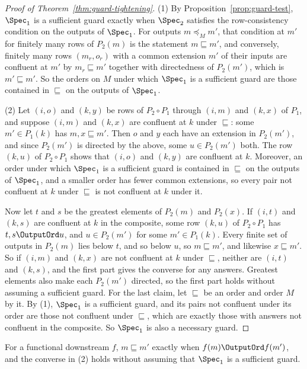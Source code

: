 \begin{proof}[Proof of Theorem~\ref{thm:guard-tightening}]
(1) By Proposition~\ref{prop:guard-test}, $\Spec_1$ is a sufficient guard exactly when
$\Spec_2$ satisfies the row-consistency condition on the outputs of
$\Spec_1$.  For outputs $m\preceq_M m'$, that condition at $m'$ for finitely
many rows of $P_2(m)$ is the statement $m\sqsubseteq m'$, and conversely,
finitely many rows $(m_r,o_r)$ with a common extension $m'$ of their inputs
are confluent at $m'$ by $m_r\sqsubseteq m'$ together with directedness of
$P_2(m')$, which is $m'\sqsubseteq m'$.  So the orders on $M$ under which
$\Spec_1$ is a sufficient guard are those contained in $\sqsubseteq$ on the
outputs of $\Spec_1$.

(2) Let $(i,o)$ and $(k,y)$ be rows of $P_2\circ P_1$ through $(i,m)$ and
$(k,x)$ of $P_1$, and suppose $(i,m)$ and $(k,x)$ are confluent at $k$ under
$\sqsubseteq$: some $m'\in P_1(k)$ has $m,x\sqsubseteq m'$.  Then $o$ and $y$
each have an extension in $P_2(m')$, and since $P_2(m')$ is directed by the above,
some $u\in P_2(m')$ \outrel both.  The row $(k,u)$ of $P_2\circ P_1$ shows
that $(i,o)$ and $(k,y)$ are confluent at $k$.  Moreover, an
order under which $\Spec_1$ is a sufficient guard is contained in $\sqsubseteq$ on the
outputs of $\Spec_1$, and a smaller order has fewer common extensions,
so every pair not confluent at $k$ under $\sqsubseteq$ is not confluent at $k$ under it.

Now let $t$ and $s$ be the greatest elements of $P_2(m)$ and $P_2(x)$.  If
$(i,t)$ and $(k,s)$ are confluent at $k$ in the composite, some row $(k,u)$
of $P_2\circ P_1$ has $t,s\OutputOrd u$, and $u\in P_2(m')$ for some
$m'\in P_1(k)$.  Every finite set of outputs in $P_2(m)$ lies below $t$, and
so below $u$, so $m\sqsubseteq m'$, and likewise $x\sqsubseteq m'$.  So
if $(i,m)$ and $(k,x)$ are not confluent at $k$ under $\sqsubseteq$, neither are
$(i,t)$ and $(k,s)$, and the first part gives the converse for any answers.
Greatest elements also make each $P_2(m')$ directed, so the first part holds
without assuming a sufficient guard.
For the last claim, let $\sqsubseteq$ be an order and order $M$ by it.  By
(1), $\Spec_1$ is a sufficient guard, and its pairs not confluent under its
order are those not confluent under $\sqsubseteq$, which are exactly those
with answers not confluent in the composite.  So $\Spec_1$ is also a
necessary guard.
\end{proof}

For a functional downstream $f$, $m\sqsubseteq m'$ exactly when $f(m)\OutputOrd
f(m')$, and the converse in (2) holds without assuming that $\Spec_1$ is a
sufficient guard.

